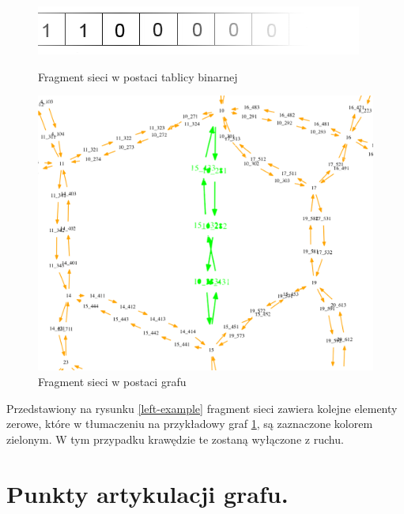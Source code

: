 \documentclass[twoside,12pt]{report}
\begin{document}
\begin{figure}[ht]
\begin{flushleft}
	\begin{minipage}[c]{.47\textwidth}
	\vspace*{80px}
	\centering
	\includegraphics[width=\textwidth]{img/bool}
	\caption{Fragment sieci w postaci tablicy binarnej }
	\label{left-example}
\end{minipage}%
\end{flushleft}
\begin{flushright}
	\begin{minipage}[c]{.47\textwidth}
	\centering
	\includegraphics[width=\textwidth]{img/bool-efect}
	\caption{Fragment sieci w postaci grafu}
	\label{right-example}
	\end{minipage}
\end{flushright}
\end{figure}

Przedstawiony na rysunku \ref{left-example} fragment sieci zawiera kolejne elementy zerowe, które w tłumaczeniu na przykładowy graf \ref{right-example}, są zaznaczone kolorem zielonym. W tym przypadku krawędzie te zostaną wyłączone z ruchu. 

\section{Punkty artykulacji grafu.}
\end{document}
